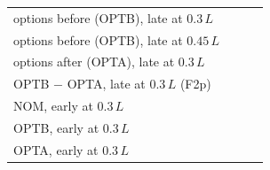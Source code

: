 \begin{table}[!htbp]
\begin{tabular}{@{}lccc@{}}
options before (OPTB), late at $0.3\,L$ & \SnineCI{\NqPsgLateOptbThirtyMistralSeven}{\NqPsgLateOptbThirtyMistralSevenLo}{\NqPsgLateOptbThirtyMistralSevenHi} & \SnineCI{\NqPsgLateOptbThirtyLlamaEight}{\NqPsgLateOptbThirtyLlamaEightLo}{\NqPsgLateOptbThirtyLlamaEightHi} & \SnineCI{\NqPsgLateOptbThirtyQwenSeven}{\NqPsgLateOptbThirtyQwenSevenLo}{\NqPsgLateOptbThirtyQwenSevenHi} \\
options before (OPTB), late at $0.45\,L$ & \SnineCI{\NqPsgLateOptbFortyfiveMistralSeven}{\NqPsgLateOptbFortyfiveMistralSevenLo}{\NqPsgLateOptbFortyfiveMistralSevenHi} & \SnineCI{\NqPsgLateOptbFortyfiveLlamaEight}{\NqPsgLateOptbFortyfiveLlamaEightLo}{\NqPsgLateOptbFortyfiveLlamaEightHi} & \SnineCI{\NqPsgLateOptbFortyfiveQwenSeven}{\NqPsgLateOptbFortyfiveQwenSevenLo}{\NqPsgLateOptbFortyfiveQwenSevenHi} \\
options after (OPTA), late at $0.3\,L$ & \SnineCI{\NqPsgLateOptaThirtyMistralSeven}{\NqPsgLateOptaThirtyMistralSevenLo}{\NqPsgLateOptaThirtyMistralSevenHi} & \SnineCI{\NqPsgLateOptaThirtyLlamaEight}{\NqPsgLateOptaThirtyLlamaEightLo}{\NqPsgLateOptaThirtyLlamaEightHi} & \SnineCI{\NqPsgLateOptaThirtyQwenSeven}{\NqPsgLateOptaThirtyQwenSevenLo}{\NqPsgLateOptaThirtyQwenSevenHi} \\
OPTB $-$ OPTA, late at $0.3\,L$ (F2p) & \SnineCI{\NqPsgGapMistralSeven}{\NqPsgGapMistralSevenLo}{\NqPsgGapMistralSevenHi} & \SnineCI{\NqPsgGapLlamaEight}{\NqPsgGapLlamaEightLo}{\NqPsgGapLlamaEightHi} & \SnineCI{\NqPsgGapQwenSeven}{\NqPsgGapQwenSevenLo}{\NqPsgGapQwenSevenHi} \\
\addlinespace
NOM, early at $0.3\,L$ & \SnineCI{\NqPsgEarlyNomThirtyMistralSeven}{\NqPsgEarlyNomThirtyMistralSevenLo}{\NqPsgEarlyNomThirtyMistralSevenHi} & \SnineCI{\NqPsgEarlyNomThirtyLlamaEight}{\NqPsgEarlyNomThirtyLlamaEightLo}{\NqPsgEarlyNomThirtyLlamaEightHi} & \SnineCI{\NqPsgEarlyNomThirtyQwenSeven}{\NqPsgEarlyNomThirtyQwenSevenLo}{\NqPsgEarlyNomThirtyQwenSevenHi} \\
OPTB, early at $0.3\,L$ & \SnineCI{\NqPsgEarlyOptbThirtyMistralSeven}{\NqPsgEarlyOptbThirtyMistralSevenLo}{\NqPsgEarlyOptbThirtyMistralSevenHi} & \SnineCI{\NqPsgEarlyOptbThirtyLlamaEight}{\NqPsgEarlyOptbThirtyLlamaEightLo}{\NqPsgEarlyOptbThirtyLlamaEightHi} & \SnineCI{\NqPsgEarlyOptbThirtyQwenSeven}{\NqPsgEarlyOptbThirtyQwenSevenLo}{\NqPsgEarlyOptbThirtyQwenSevenHi} \\
OPTA, early at $0.3\,L$ & \SnineCI{\NqPsgEarlyOptaThirtyMistralSeven}{\NqPsgEarlyOptaThirtyMistralSevenLo}{\NqPsgEarlyOptaThirtyMistralSevenHi} & \SnineCI{\NqPsgEarlyOptaThirtyLlamaEight}{\NqPsgEarlyOptaThirtyLlamaEightLo}{\NqPsgEarlyOptaThirtyLlamaEightHi} & \SnineCI{\NqPsgEarlyOptaThirtyQwenSeven}{\NqPsgEarlyOptaThirtyQwenSevenLo}{\NqPsgEarlyOptaThirtyQwenSevenHi} \\
\bottomrule
\end{tabular}
\end{table}

